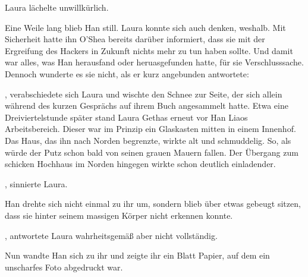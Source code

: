 \par

Laura lächelte unwillkürlich. 

\par

Eine Weile lang blieb Han still. Laura konnte sich auch denken, weshalb. Mit Sicherheit hatte ihn O'Shea bereits darüber informiert, dass sie mit der Ergreifung des Hackers in Zukunft nichts mehr zu tun haben sollte. Und damit war alles, was Han herausfand oder heruasgefunden hatte, für sie Verschlusssache. Dennoch wunderte es sie nicht, als er kurz angebunden antwortete: 

\par

, verabschiedete sich Laura und wischte den Schnee zur Seite, der sich allein während des kurzen Gesprächs auf ihrem Buch angesammelt hatte. 
\ortswechsel
Etwa eine Dreiviertelstunde später stand Laura Gethas erneut vor Han Liaos Arbeitsbereich. Dieser war im Prinzip ein Glaskasten mitten in einem Innenhof. Das Haus, das ihn nach Norden begrenzte, wirkte alt und schmuddelig. So, als würde der Putz schon bald von seinen grauen Mauern fallen. Der Übergang zum schicken Hochhaus im Norden hingegen wirkte schon deutlich einladender.

\par

, sinnierte Laura.

\par

Han drehte sich nicht einmal zu ihr um, sondern blieb über etwas gebeugt sitzen, dass sie hinter seinem massigen Körper nicht erkennen konnte. 

\par

, antwortete Laura wahrheitsgemäß aber nicht vollständig.

\par

Nun wandte Han sich zu ihr und zeigte ihr ein Blatt Papier, auf dem ein unscharfes Foto abgedruckt war.

\par

